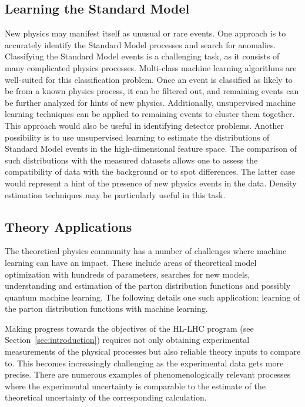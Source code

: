 \subsection{Learning the Standard Model}

New physics may manifest itself as unusual or rare events. One approach is to accurately identify the Standard Model processes and search for anomalies. Classifying the Standard Model events is a challenging task, as it consists of many complicated physics processes. Multi-class machine learning algorithms are well-suited for this classification problem. Once an event is classified as likely to be from a known physics process, it can be filtered out, and remaining events can be further analyzed for hints of new physics. Additionally, unsupervised machine learning techniques can be applied to remaining events to cluster them together. This approach would also be useful in identifying detector problems.
Another possibility is to use unsupervised learning to estimate the distributions of Standard Model events in the high-dimensional feature space. The comparison of such distributions with the measured datasets allows one to assess the compatibility of data with the background or to spot differences. The latter case would represent a hint of the presence of new physics events in the data. Density estimation techniques may be particularly useful in this task.

\subsection{Theory Applications}

The theoretical physics community has a number of challenges where machine learning can have an impact. These include areas of theoretical model optimization with hundreds of parameters, searches for new models,  understanding and estimation of the parton distribution functions and possibly quantum machine learning. The following details one such application: learning of the parton distribution functions with machine learning.

Making progress towards the objectives of the HL-LHC program (see Section~\ref{sec:introduction}) requires not only
obtaining experimental measurements of the physical processes but also reliable theory inputs to compare to. This becomes increasingly challenging as the experimental data gets more precise. There are numerous examples of phenomenologically relevant processes where the experimental uncertainty is comparable to the estimate of the theoretical uncertainty of the corresponding calculation.

